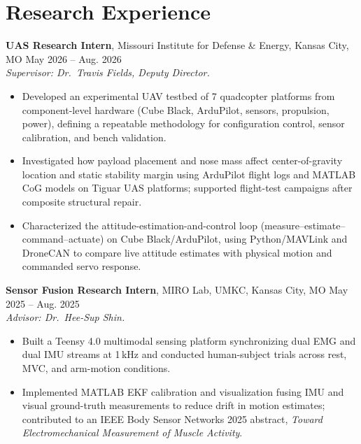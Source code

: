 \documentclass[11pt, letterpaper]{article}
\newcommand{\role}[5]{%
  \noindent\textbf{#1}, #2, #3, #4 \hfill #5%
}
\begin{document}
\section{Research Experience}
\role{UAS Research Intern}{Missouri Institute for Defense \& Energy}{Kansas City}{MO}{May 2026 -- Aug. 2026} \\[-2pt]
\textit{\small Supervisor: Dr.\ Travis Fields, Deputy Director.}
\begin{itemize}
\item Developed an experimental UAV testbed of 7 quadcopter platforms from component-level hardware (Cube Black, ArduPilot, sensors, propulsion, power), defining a repeatable methodology for configuration control, sensor calibration, and bench validation.
\item Investigated how payload placement and nose mass affect center-of-gravity location and static stability margin using ArduPilot flight logs and MATLAB CoG models on Tiguar UAS platforms; supported flight-test campaigns after composite structural repair.
\item Characterized the attitude-estimation-and-control loop (measure--estimate--command--actuate) on Cube Black/ArduPilot, using Python/MAVLink and DroneCAN to compare live attitude estimates with physical motion and commanded servo response.
\end{itemize}
\role{Sensor Fusion Research Intern}{MIRO Lab, UMKC}{Kansas City}{MO}{May 2025 -- Aug. 2025} \\[-2pt]
\textit{\small Advisor: Dr.\ Hee-Sup Shin.}
\begin{itemize}
\item Built a Teensy 4.0 multimodal sensing platform synchronizing dual EMG and dual IMU streams at 1\,kHz and conducted human-subject trials across rest, MVC, and arm-motion conditions.
\item Implemented MATLAB EKF calibration and visualization fusing IMU and visual ground-truth measurements to reduce drift in motion estimates; contributed to an IEEE Body Sensor Networks 2025 abstract, \textit{Toward Electromechanical Measurement of Muscle Activity}.
\end{itemize}
\end{document}
